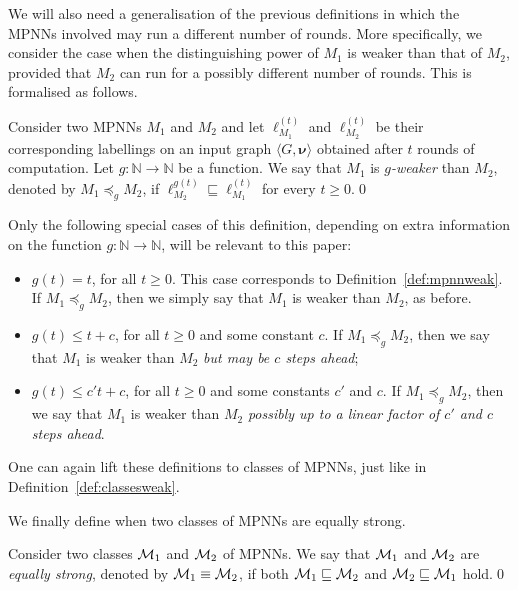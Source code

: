 We will also need a generalisation of the previous definitions in which the MPNNs involved may run a different number of rounds.  More specifically, we consider the case when the distinguishing power of $M_1$ is weaker than that of $M_2$, provided that $M_2$ can run for a possibly different number of rounds. This is formalised as follows.

\begin{definition}\normalfont
Consider two MPNNs $M_1$ and $M_2$ and let $\pmb{\ell}_{M_1}^{(t)}$ and $\pmb{\ell}_{M_2}^{(t)}$  be their corresponding labellings on an input graph $\langle G,\pmb{\nu}\rangle$ obtained after $t$ rounds of computation. Let $g:\mathbb{N}\to \mathbb{N}$ be a function. We say that $M_1$ is \textit{$g$-weaker} than $M_2$, denoted by $M_1\preceq_{g} M_2$, if 
$\pmb{\ell}_{M_2}^{g(t)}\sqsubseteq
\pmb{\ell}_{M_1}^{(t)}$ for every $t\geq 0$.\qed
\end{definition}

Only the following special cases of this definition, depending on extra information on the function $g:\mathbb{N}\to\mathbb{N}$, will be relevant to this paper:
\begin{itemize}
    \item $g(t)=t$, for all $t\geq 0$. This case corresponds to Definition~\ref{def:mpnnweak}. If $M_1\preceq_{g} M_2$, then we simply say that $M_1$ is weaker than $M_2$, as before.
    \item $g(t)\leq t+c$, for all $t\geq 0$ and some constant $c$. If $M_1\preceq_{g} M_2$, then we say that $M_1$ is weaker than $M_2$ \textit{but may be $c$ steps ahead};
    \item $g(t)\leq c't+c$, for all $t\geq 0$ and some constants $c'$ and $c$. If $M_1\preceq_{g} M_2$, then we say that $M_1$ is weaker than $M_2$ \textit{possibly up to a linear factor of $c'$ and $c$ steps ahead}.
\end{itemize}

One can again lift these definitions to classes of MPNNs, just like in Definition~\ref{def:classesweak}.

We finally define when two classes of MPNNs are equally strong.
\begin{definition}\normalfont
Consider two classes $\mathcal{M}_1$ and $\mathcal{M}_2$ of MPNNs. We say that 
$\mathcal{M}_1$ and $\mathcal{M}_2$ are \textit{equally strong}, denoted by $\mathcal{M}_1\equiv \mathcal{M}_2$, if 
both  $\mathcal{M}_1\sqsubseteq \mathcal{M}_2$ 
and  $\mathcal{M}_2\sqsubseteq \mathcal{M}_1$ hold.\qed\end{definition}

